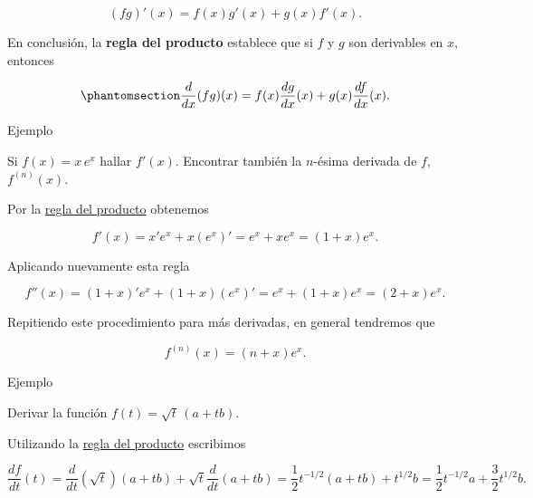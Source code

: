 \documentclass[
  letterpaper,
]{book}
\theoremstyle{plain}
\theoremstyle{remark}
\begin{document}
\[
(fg)'(x)=f(x)g'(x)+g(x)f'(x).
\]

En conclusión, la \textbf{regla del producto} establece que si \(f\) y
\(g\) son derivables en \(x\), entonces

\begin{equation}\phantomsection\label{eq-regla-producto}{
\frac{d}{dx}(fg)(x)=f(x)\frac{dg}{dx}(x)+g(x)\frac{df}{dx}(x).
}\end{equation}

Ejemplo

Si \(f(x)=x\,e^x\) hallar \(f'(x)\). Encontrar también la \(n\)-ésima
derivada de \(f\), \(f^{(n)}(x)\).

\begin{tcolorbox}[enhanced jigsaw, opacityback=0, left=2mm, opacitybacktitle=0.6, toprule=.15mm, bottomrule=.15mm, colbacktitle=quarto-callout-tip-color!10!white, titlerule=0mm, bottomtitle=1mm, title=\textcolor{quarto-callout-tip-color}{\faLightbulb}\hspace{0.5em}{Solución}, toptitle=1mm, colframe=quarto-callout-tip-color-frame, colback=white, breakable, rightrule=.15mm, arc=.35mm, leftrule=.75mm, coltitle=black]

Por la \hyperref[eq-regla-producto]{regla del producto} obtenemos

\[
f'(x)=x'e^x+x\left(e^x\right)'=e^x+xe^x=(1+x)e^x.
\]

Aplicando nuevamente esta regla

\[
f''(x)=(1+x)'e^x+(1+x)\left(e^x\right)'=e^x+(1+x)e^x=(2+x)e^x.
\]

Repitiendo este procedimiento para más derivadas, en general tendremos
que

\[
f^{(n)}(x)=(n+x)e^x.
\]

\end{tcolorbox}

Ejemplo

Derivar la función \(f(t)=\sqrt{t}\,(a+tb)\).

\begin{tcolorbox}[enhanced jigsaw, opacityback=0, left=2mm, opacitybacktitle=0.6, toprule=.15mm, bottomrule=.15mm, colbacktitle=quarto-callout-tip-color!10!white, titlerule=0mm, bottomtitle=1mm, title=\textcolor{quarto-callout-tip-color}{\faLightbulb}\hspace{0.5em}{Solución}, toptitle=1mm, colframe=quarto-callout-tip-color-frame, colback=white, breakable, rightrule=.15mm, arc=.35mm, leftrule=.75mm, coltitle=black]

Utilizando la \hyperref[eq-regla-producto]{regla del producto}
escribimos

\[
\frac{df}{dt}(t)=\frac{d}{dt}\left(\sqrt{t}\right)(a+tb)+\sqrt{t}\frac{d}{dt}(a+tb)=\frac{1}{2}t^{-1/2}(a+tb)+t^{1/2}b=\frac{1}{2}t^{-1/2}a+\frac{3}{2}t^{1/2}b.
\]

\end{tcolorbox}
\end{document}
